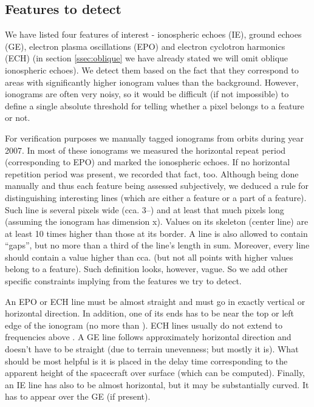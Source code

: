 \subsection{Features to detect}
We have listed four features of interest - ionospheric echoes (IE), ground echoes (GE), electron plasma oscillations (EPO) and electron cyclotron harmonics (ECH) (in section \ref{ssec:oblique} we have already stated we will omit oblique ionospheric echoes). We detect them based on the fact that they correspond to areas with significantly higher ionogram values than the background. However, ionograms are often very noisy, so it would be difficult (if not impossible) to define a single absolute threshold for telling whether a pixel belongs to a feature or not. 

For verification purposes we manually tagged  ionograms from  orbits during year 2007. In most of these ionograms we measured the horizontal repeat period (corresponding to EPO) and marked the ionospheric echoes. If no horizontal repetition period was present, we recorded that fact, too. Although being done manually and thus each feature being assessed subjectively, we deduced a rule for distinguishing interesting lines (which are either a feature or a part of a feature). Such line is several pixels wide (cca. 3--) and at least that much pixels long (assuming the ionogram has dimension x). Values on its skeleton (center line) are at least 10 times higher than those at its border. A line is also allowed to contain ``gaps'', but no more than a third of the line's length in sum. Moreover, every line should contain a value higher than cca.  (but not all points with higher values belong to a feature). Such definition looks, however, vague. So we add other specific constraints implying from the features we try to detect. 

An EPO or ECH line must be almost straight and must go in exactly vertical or horizontal direction. In addition, one of its ends has to be near the top or left edge of the ionogram (no more than ). ECH lines usually do not extend to frequencies above . A GE line follows approximately horizontal direction and doesn't have to be straight (due to terrain unevenness; but mostly it is). What should be most helpful is it is placed in the delay time corresponding to the apparent height of the spacecraft over surface (which can be computed). Finally, an IE line has also to be almost horizontal, but it may be substantially curved. It has to appear over the GE (if present).

